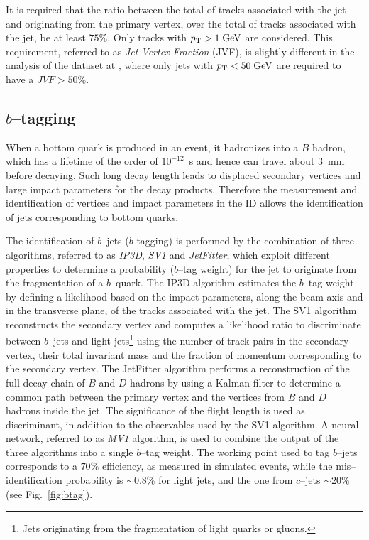 It is required that the ratio between the total \pt{} of tracks
associated with the jet and originating from the primary vertex, over the
total \pt{} of tracks associated with the jet, be at least
$75\%$. Only tracks with $p_{\mathrm{T}}{}>1 \; \mathrm{GeV}$ are considered.
This requirement, referred to as {\it Jet Vertex Fraction} (JVF), is
slightly different in the analysis of the dataset at \eighttev{},
where only jets with $p_{\mathrm{T}}{}<50 \; \mathrm{GeV}{}$ are required to have a
$JVF>50\%$. 

\subsection{$b$--tagging}
\label{sec:btag}

When a bottom quark is produced in an event, it hadronizes into a $B$
hadron, which has a lifetime of the order of $10^{-12}$~s and hence
can travel about 3~mm before decaying.
Such long decay length leads to displaced secondary vertices and large
impact parameters for the decay products. Therefore the measurement
and identification of vertices and impact parameters in the ID allows the
identification of jets corresponding to bottom quarks.

The identification of $b$--jets ($b$-tagging) is performed by the
combination of three algorithms, referred to as {\it
  IP3D}, {\it SV1} and {\it JetFitter}, which exploit different properties to
determine a probability ($b$--tag weight) for the jet to originate
from the fragmentation of a $b$--quark. 
The IP3D algorithm estimates the $b$--tag weight by defining a
likelihood based on the impact parameters, along the beam axis and in
the transverse plane, of the tracks associated with the jet.
The SV1 algorithm reconstructs the secondary vertex and computes a
likelihood ratio to discriminate between $b$--jets and light
jets\footnote{Jets originating from the fragmentation of light quarks
  or gluons.} using the number of track pairs in the secondary vertex,
their total invariant mass and the fraction of momentum corresponding
to the secondary vertex.
The JetFitter algorithm performs a reconstruction of the full decay
chain of $B$ and $D$ hadrons by using a Kalman filter to determine a
common path between the primary vertex and the vertices from $B$ and
$D$ hadrons inside the jet. The significance of the flight length is
used as discriminant, in addition to the observables used by the
SV1 algorithm.
A neural network, referred to as {\it MV1} algorithm, is used to combine the
output of the three algorithms into a single $b$--tag weight.
The working point used to tag $b$--jets corresponds to a $70\%$
efficiency, as measured in \ttbar{} simulated events, while the
mis--identification probability is $\sim0.8\%$ for light jets, and the
one from $c$--jets $\sim20\%$ (see Fig.~\ref{fig:btag}). 

